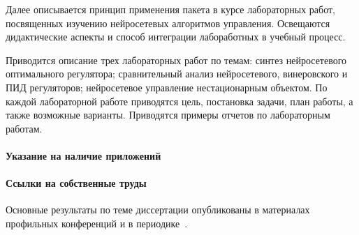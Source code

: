 Далее описывается принцип применения пакета в курсе лабораторных
работ, посвященных изучению нейросетевых алгоритмов управления.
Освещаются дидактические аспекты и способ интеграции лабоработных в
учебный процесс.

Приводится описание трех лабораторных работ по темам: синтез
нейросетевого оптимального регулятора; сравнительный анализ
нейросетевого, винеровского и ПИД регуляторов; нейросетевое управление
нестационарным объектом.  По каждой лабораторной работе приводятся
цель, постановка задачи, план работы, а также возможные варианты.
Приводятся примеры отчетов по лабораторным работам.

\paragraph{Указание на наличие приложений}

\paragraph{Ссылки на собственные труды}
Основные результаты по теме диссертации опубликованы в материалах
профильных конференций и в периодике~\cite{elfil-pta99,filelav-ict99,
  filel-ict2000,filel-ist2000,elfil-iwk2000,filel-ict2003,el-neurocomp2002,
  elzenk-extrob2006,elfil-modctrl2006,filel-iwk2010,elfil-vestmei2010}.
